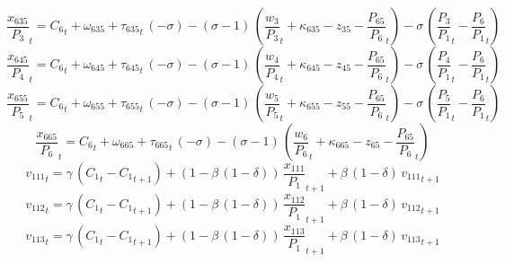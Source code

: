 \begin{dmath}
{{\frac{x_{635}}{P_{3}}}}_{t}={{C_{6}}}_{t}+{{\omega_{635}}}+{{\tau_{635}}}_{t}\, \left(-{{\sigma}}\right)-\left({{\sigma}}-1\right)\, \left({{\frac{w_{3}}{P_{3}}}}_{t}+{{\kappa_{635}}}-{{z_{35}}}-{{\frac{P_{65}}{P_{6}}}}_{t}\right)-{{\sigma}}\, \left({{\frac{P_{3}}{P_{1}}}}_{t}-{{\frac{P_{6}}{P_{1}}}}_{t}\right)
\end{dmath}
\begin{dmath}
{{\frac{x_{645}}{P_{4}}}}_{t}={{C_{6}}}_{t}+{{\omega_{645}}}+{{\tau_{645}}}_{t}\, \left(-{{\sigma}}\right)-\left({{\sigma}}-1\right)\, \left({{\frac{w_{4}}{P_{4}}}}_{t}+{{\kappa_{645}}}-{{z_{45}}}-{{\frac{P_{65}}{P_{6}}}}_{t}\right)-{{\sigma}}\, \left({{\frac{P_{4}}{P_{1}}}}_{t}-{{\frac{P_{6}}{P_{1}}}}_{t}\right)
\end{dmath}
\begin{dmath}
{{\frac{x_{655}}{P_{5}}}}_{t}={{C_{6}}}_{t}+{{\omega_{655}}}+{{\tau_{655}}}_{t}\, \left(-{{\sigma}}\right)-\left({{\sigma}}-1\right)\, \left({{\frac{w_{5}}{P_{5}}}}_{t}+{{\kappa_{655}}}-{{z_{55}}}-{{\frac{P_{65}}{P_{6}}}}_{t}\right)-{{\sigma}}\, \left({{\frac{P_{5}}{P_{1}}}}_{t}-{{\frac{P_{6}}{P_{1}}}}_{t}\right)
\end{dmath}
\begin{dmath}
{{\frac{x_{665}}{P_{6}}}}_{t}={{C_{6}}}_{t}+{{\omega_{665}}}+{{\tau_{665}}}_{t}\, \left(-{{\sigma}}\right)-\left({{\sigma}}-1\right)\, \left({{\frac{w_{6}}{P_{6}}}}_{t}+{{\kappa_{665}}}-{{z_{65}}}-{{\frac{P_{65}}{P_{6}}}}_{t}\right)
\end{dmath}
\begin{dmath}
{{v_{111}}}_{t}={{\gamma}}\, \left({{C_{1}}}_{t}-{{C_{1}}}_{t+1}\right)+\left(1-{{\beta}}\, \left(1-{{\delta}}\right)\right)\, {{\frac{x_{111}}{P_{1}}}}_{t+1}+{{\beta}}\, \left(1-{{\delta}}\right)\, {{v_{111}}}_{t+1}
\end{dmath}
\begin{dmath}
{{v_{112}}}_{t}={{\gamma}}\, \left({{C_{1}}}_{t}-{{C_{1}}}_{t+1}\right)+\left(1-{{\beta}}\, \left(1-{{\delta}}\right)\right)\, {{\frac{x_{112}}{P_{1}}}}_{t+1}+{{\beta}}\, \left(1-{{\delta}}\right)\, {{v_{112}}}_{t+1}
\end{dmath}
\begin{dmath}
{{v_{113}}}_{t}={{\gamma}}\, \left({{C_{1}}}_{t}-{{C_{1}}}_{t+1}\right)+\left(1-{{\beta}}\, \left(1-{{\delta}}\right)\right)\, {{\frac{x_{113}}{P_{1}}}}_{t+1}+{{\beta}}\, \left(1-{{\delta}}\right)\, {{v_{113}}}_{t+1}
\end{dmath}
